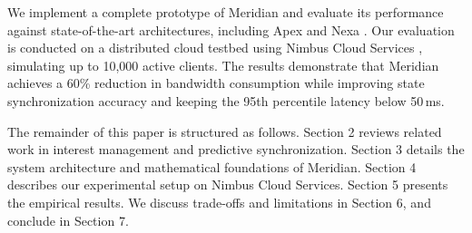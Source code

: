 We implement a complete prototype of Meridian and evaluate its performance against state-of-the-art architectures, including Apex \cite{apex2022routing} and Nexa \cite{nexa2023scaling}. Our evaluation is conducted on a distributed cloud testbed using Nimbus Cloud Services \cite{nimbus2024cloud}, simulating up to 10,000 active clients. The results demonstrate that Meridian achieves a 60\% reduction in bandwidth consumption while improving state synchronization accuracy and keeping the 95th percentile latency below 50\,ms.

The remainder of this paper is structured as follows. Section 2 reviews related work in interest management and predictive synchronization. Section 3 details the system architecture and mathematical foundations of Meridian. Section 4 describes our experimental setup on Nimbus Cloud Services. Section 5 presents the empirical results. We discuss trade-offs and limitations in Section 6, and conclude in Section 7.
